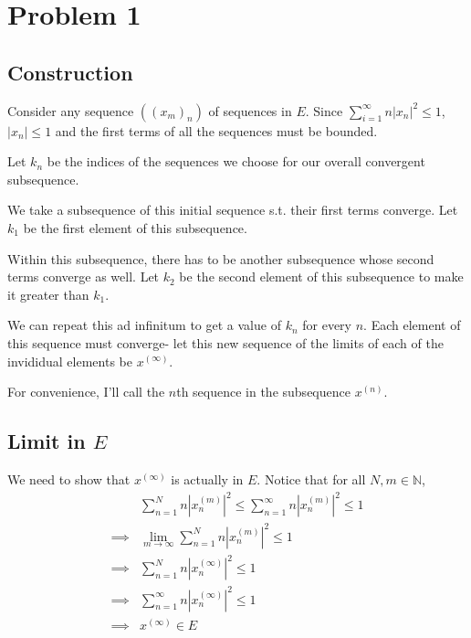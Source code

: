 \documentclass[12pt]{article}
\newcommand{\N}{\mathbb{N}}
\begin{document}
\section{Problem 1}

\subsection{Construction}

Consider any sequence $((x_m)_n)$ of sequences in $E$.
Since $\sum_{i=1}^{\infty} n|x_n|^2 \le 1$, $|x_n| \le 1$
and the first terms of all the sequences must be bounded.

Let $k_n$ be the indices of the sequences we choose for our overall convergent subsequence.

We take a subsequence of this initial sequence s.t. their first terms converge.
Let $k_1$ be the first element of this subsequence.

Within this subsequence, there has to be another subsequence whose second terms converge as well.
Let $k_2$ be the second element of this subsequence to make it greater than $k_1$.

We can repeat this ad infinitum to get a value of $k_n$ for every $n$.
Each element of this sequence must converge- let this new sequence
of the limits of each of the invididual elements be $x^{(\infty)}$.

For convenience, I'll call the $n$th sequence in the subsequence $x^{(n)}$.

\subsection{Limit in \texorpdfstring{$E$}{E}}

We need to show that $x^{(\infty)}$ is actually in $E$.
Notice that for all $N, m \in \N$,
\begin{align*}
             & \sum_{n=1}^{N} n\left|x^{(m)}_n\right|^2 \le \sum_{n=1}^{\infty} n\left|x^{(m)}_n\right|^2 \le 1 \\
  \implies{} & \lim_{m \to \infty} \sum_{n=1}^{N} n\left|x^{(m)}_n\right|^2 \le 1                               \\
  \implies{} & \sum_{n=1}^{N} n\left|x^{(\infty)}_n\right|^2 \le 1                                              \\
  \implies{} & \sum_{n=1}^{\infty} n\left|x^{(\infty)}_n\right|^2 \le 1                                         \\
  \implies{} & x^{(\infty)} \in E
\end{align*}
\end{document}
